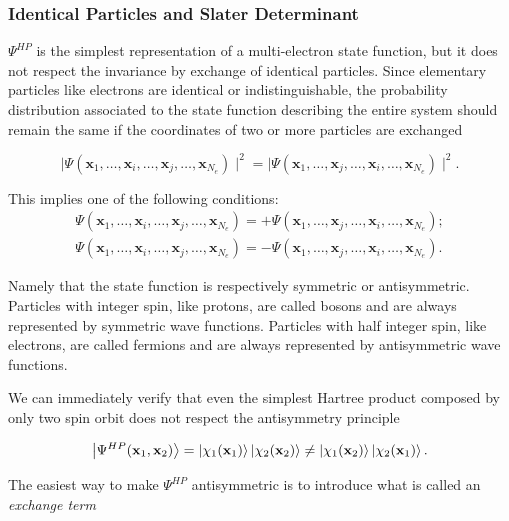 \documentclass[a4paper,12pt]{article}
\begin{document}
\subsubsection{Identical Particles and Slater Determinant}

$\Psi^{HP}$ is the simplest representation of a multi-electron state function, but it does not respect the invariance by exchange of identical particles.
Since elementary particles like electrons are identical or indistinguishable, the probability distribution associated to the state function describing the entire system should remain the same if the coordinates of two or more particles are exchanged

\begin{equation}
	\mid \Psi(\mathbf{x}_1,\dots,\mathbf{x}_i,\dots,\mathbf{x}_j,\dots,\mathbf{x}_{N_e}) \mid^2 = \mid \Psi(\mathbf{x}_1,\dots,\mathbf{x}_j,\dots,\mathbf{x}_i,\dots,\mathbf{x}_{N_e}) \mid^2.
\end{equation}

This implies one of the following conditions:
\begin{align}
	\Psi(\mathbf{x}_1,\dots,\mathbf{x}_i,\dots,\mathbf{x}_j,\dots,\mathbf{x}_{N_e}) = 
		+\Psi(\mathbf{x}_1,\dots,\mathbf{x}_j,\dots,\mathbf{x}_i,\dots,\mathbf{x}_{N_e});\\
	\Psi(\mathbf{x}_1,\dots,\mathbf{x}_i,\dots,\mathbf{x}_j,\dots,\mathbf{x}_{N_e}) = 
		-\Psi(\mathbf{x}_1,\dots,\mathbf{x}_j,\dots,\mathbf{x}_i,\dots,\mathbf{x}_{N_e}).
\end{align}

Namely that the state function is respectively symmetric or antisymmetric.
Particles with integer spin, like protons, are called bosons and are always represented by symmetric wave functions.
Particles with half integer spin, like electrons, are called fermions and are always represented by antisymmetric wave functions.

We can immediately verify that even the simplest Hartree product composed by only two spin orbit does not respect the antisymmetry principle

\begin{equation*}
	\ket{\Psi^{HP}(\mathbf{x}_1,\mathbf{x}_2)} = \ket{\chi_1(\mathbf{x}_1)} \ket{\chi_2(\mathbf{x}_2)} \neq \ket{\chi_1(\mathbf{x}_2)} \ket{\chi_2(\mathbf{x}_1)}.
\end{equation*}

The easiest way to make $\Psi^{HP}$ antisymmetric is to introduce what is called an \textit{exchange term}
\end{document}
